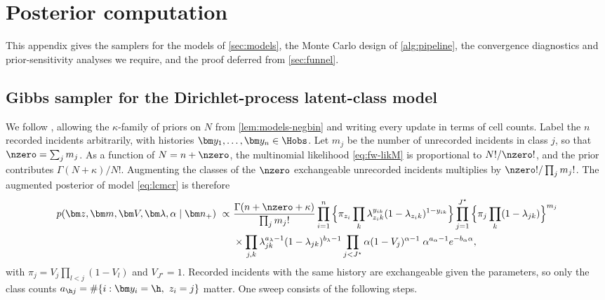 \section{Posterior computation}\label{app:computation}

This appendix gives the samplers for the models of \cref{sec:models}, the Monte Carlo design of \cref{alg:pipeline}, the convergence diagnostics and prior-sensitivity analyses we require, and the proof deferred from \cref{sec:funnel}.

\subsection{Gibbs sampler for the Dirichlet-process latent-class model}\label{app:comp-lcmcr}

We follow \citet{manriquevallier2016}, allowing the $\kappa$-family of priors on $N$ from \cref{lem:models-negbin} and writing every update in terms of cell counts. Label the $n$ recorded incidents arbitrarily, with histories $\bm y_1,\dots,\bm y_n\in\Hobs$. Let $m_j$ be the number of unrecorded incidents in class $j$, so that $\nzero=\sum_jm_j$. As a function of $N=n+\nzero$, the multinomial likelihood \eqref{eq:fw-likM} is proportional to $N!/\nzero!$, and the prior contributes $\Gamma(N+\kappa)/N!$. Augmenting the classes of the $\nzero$ exchangeable unrecorded incidents multiplies by $\nzero!/\prod_jm_j!$. The augmented posterior of model \eqref{eq:lcmcr} is therefore
\begin{equation}\label{eq:app-joint}
\begin{aligned}
  p(\bm z,\bm m,\bm V,\bm\lambda,\alpha\mid\bm n_+)\ \propto\ &
  \frac{\Gamma(n+\nzero+\kappa)}{\prod_jm_j!}
  \prod_{i=1}^{n}\Big\{\pi_{z_i}\prod_{k}\lambda_{z_ik}^{y_{ik}}(1-\lambda_{z_ik})^{1-y_{ik}}\Big\}
  \prod_{j=1}^{J^\star}\Big\{\pi_j\prod_k(1-\lambda_{jk})\Big\}^{m_j}\\
  &\times\prod_{j,k}\lambda_{jk}^{a_\lambda-1}(1-\lambda_{jk})^{b_\lambda-1}
  \prod_{j<J^\star}\alpha(1-V_j)^{\alpha-1}\;
  \alpha^{a_\alpha-1}e^{-b_\alpha\alpha},
\end{aligned}
\end{equation}
with $\pi_j=V_j\prod_{l<j}(1-V_l)$ and $V_{J^\star}=1$. Recorded incidents with the same history are exchangeable given the parameters, so only the class counts $a_{\h j}=\#\{i:\bm y_i=\h,\ z_i=j\}$ matter. One sweep consists of the following steps.
